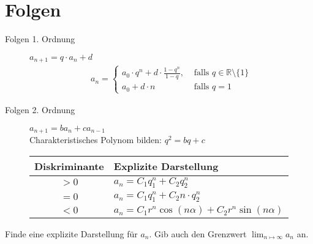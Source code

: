 \documentclass[11pt, a4paper]{article}
\begin{document}
\section{Folgen}
\begin{description}
	\item[Folgen 1. Ordnung] $a_{n+1} = q \cdot a_n + d$
		\begin{align*}
			a_n = \begin{cases}
				a_0 \cdot q^n + d \cdot \frac{1-q^n}{1-q}, &\text{ falls } q \in \mathbb{R} \setminus \{1\} \\
				a_0 + d \cdot n &\text{ falls } q=1
					\end{cases}
		\end{align*}
	\item[Folgen 2. Ordnung] $a_{n+1} = b a_n + c a_{n-1}$ \vspace{0.3cm} \\
		Charakteristisches Polynom bilden: $q^2 = bq+c$ \vspace{0.3cm} \\
		\begin{tabular}{|c|l|}
			\hline
			Diskriminante & Explizite Darstellung \\ \hline
			$>0$ & $a_n = C_1 q_1^n + C_2 q_2^n$ \\
			$=0$ & $a_n = C_1 q_1^n + C_2 n \cdot q_2^n$ \\
			$<0$ & $a_n = C_1 r^n \cos(n\alpha) + C_2 r^n \sin(n\alpha)$ \\ \hline
		\end{tabular}
\end{description}
Finde eine explizite Darstellung für $a_n$. Gib auch den Grenzwert $\displaystyle\lim_{n \mapsto \infty} a_n$ an.
\end{document}
